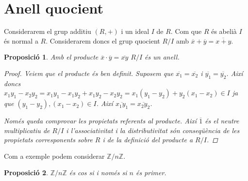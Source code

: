 \documentclass[a4paper,11pt]{report}
\newcommand{\zn}{\mathbb{Z}/n\mathbb{Z}}
\renewcommand{\bar}{\overline}
\theoremstyle{theorem}
\newtheorem{proposicio}{\normalfont \sffamily\bfseries Proposició}[section]
\theoremstyle{definition}
\begin{document}
\section{Anell quocient}
Considerarem el grup additiu $(R,+)$ i un ideal $I$ de $R$. Com que $R$ és abelià $I$ és normal a $R$. Considerarem doncs el grup quocient $R/I$ amb $\bar{x}+\bar{y}=\bar{x+y}$.
\begin{proposicio}
	Amb el producte $\bar{x}\cdot\bar{y}=\bar{xy}$ $R/I$ és un anell.
	\begin{proof}
		Veiem que el producte és ben definit. Suposem que $\bar{x_1}=\bar{x_2}$ i $\bar{y_1}=\bar{y_2}$. Així doncs $x_1y_1-x_2y_2=x_1y_1-x_1y_2+x_1y_2-x_2y_2=x_1(y_1-y_2)+y_2(x_1-x_2)\in I$ ja que $(y_1-y_2),(x_1-x_2)\in I$. Així $\bar{x_1y_1}=\bar{x_2y_2}$.
		
		Només queda comprovar les propietats referents al producte. Així $\bar{1}$ és el neutre multiplicatiu de $R/I$ i l'associativitat i la distributivitat són conseqüència de les propietats corresponents sobre $R$ i de la definició del producte a $R/I$.
	\end{proof}
\end{proposicio}

Com a exemple podem considerar $\zn$.

\begin{proposicio}
	$\zn$ és cos si i només si $n$ és primer.
\end{proposicio}
\end{document}
